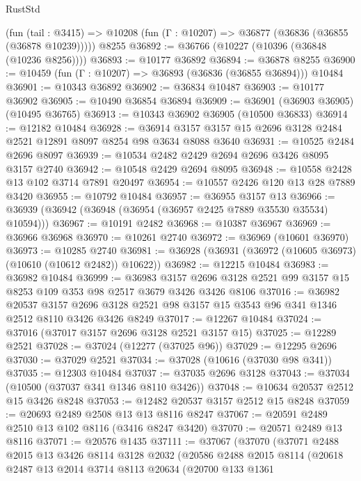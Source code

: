 \begin{lexlean}{RustStd}
\begin{coremodule}
    (fun (tail : @3415) => @10208 (fun (Γ : @10207) => @36877 (@36836 (@36855 (@36878 @10239)))))
    @8255
@36892 := @36766 (@10227 (@10396 (@36848 (@10236 @8256))))
@36893 := @10177 @36892
@36894 := @36878 @8255
@36900 := @10459 (fun (Γ : @10207) => @36893 (@36836 (@36855 @36894))) @10484
@36901 := @10343 @36892
@36902 := @36834 @10487
@36903 := @10177 @36902
@36905 := @10490 @36854 @36894
@36909 := @36901 (@36903 @36905) (@10495 @36765)
@36913 := @10343 @36902 @36905 (@10500 @36833)
@36914 := @12182 @10484
@36928 := @36914 @3157 @3157 @15 @2696 @3128 @2484 @2521 @12891 @8097 @8254 @98 @3634 @8088 @3640
@36931 := @10525 @2484 @2696 @8097
@36939 := @10534 @2482 @2429 @2694 @2696 @3426 @8095 @3157 @2740
@36942 := @10548 @2429 @2694 @8095
@36948 := @10558 @2428 @13 @102 @3714 @7891 @20497
@36954 := @10557 @2426 @120 @13 @28 @7889 @3420
@36955 := @10792 @10484
@36957 := @36955 @3157 @13
@36966 := @36939 (@36942 (@36948 (@36954 (@36957 @2425 @7889 @35530 @35534) @10594)))
@36967 := @10191 @2482
@36968 := @10387 @36967
@36969 := @36966 @36968
@36970 := @10261 @2740
@36972 := @36969 (@10601 @36970)
@36973 := @10285 @2740
@36981 := @36928 (@36931 (@36972 (@10605 @36973) (@10610 (@10612 @2482)) @10622))
@36982 := @12215 @10484
@36983 := @36982 @10484
@36999 := @36983
    @3157
    @2696
    @3128
    @2521
    @99
    @3157
    @15
    @8253
    @109
    @353
    @98
    @2517
    @3679
    @3426
    @3426
    @8106
@37016 := @36982
    @20537
    @3157
    @2696
    @3128
    @2521
    @98
    @3157
    @15
    @3543
    @96
    @341
    @1346
    @2512
    @8110
    @3426
    @3426
    @8249
@37017 := @12267 @10484
@37024 := @37016 (@37017 @3157 @2696 @3128 @2521 @3157 @15)
@37025 := @12289 @2521
@37028 := @37024 (@12277 (@37025 @96))
@37029 := @12295 @2696
@37030 := @37029 @2521
@37034 := @37028 (@10616 (@37030 @98 @341))
@37035 := @12303 @10484
@37037 := @37035 @2696 @3128
@37043 := @37034 (@10500 (@37037 @341 @1346 @8110 @3426))
@37048 := @10634 @20537 @2512 @15 @3426 @8248
@37053 := @12482 @20537 @3157 @2512 @15 @8248
@37059 := @20693 @2489 @2508 @13 @13 @8116 @8247
@37067 := @20591 @2489 @2510 @13 @102 @8116 (@3416 @8247 @3420)
@37070 := @20571 @2489 @13 @8116
@37071 := @20576 @1435
@37111 := @37067
    (@37070
      (@37071
        @2488
        @2015
        @13
        @3426
        @8114
        @3128
        @2032
        (@20586
          @2488
          @2015
          @8114
          (@20618
            @2487
            @13
            @2014
            @3714
            @8113
            @20634
            (@20700
              @133
              @1361

\end{coremodule}
\end{lexlean}
